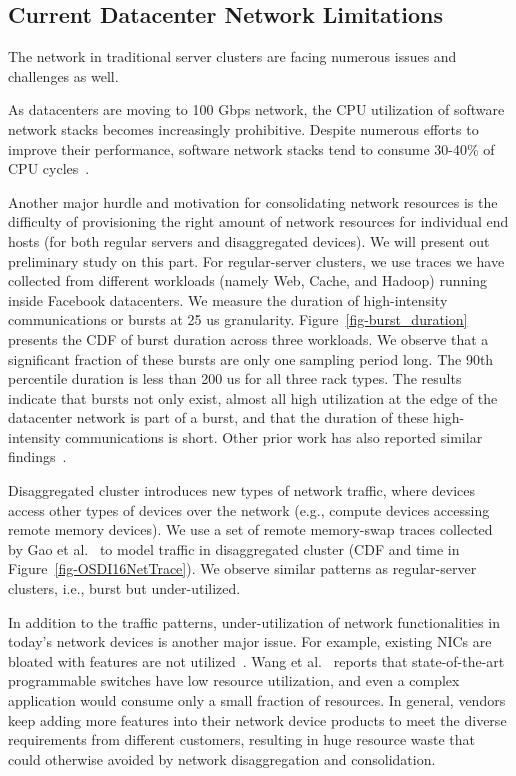 \subsection{Current Datacenter Network Limitations}

The network in traditional server clusters are facing numerous
issues and challenges as well. 

As datacenters are moving to 100 Gbps network,
the CPU utilization of software network stacks becomes increasingly prohibitive.
Despite numerous efforts to improve their performance, software network stacks
tend to consume 30-40\% of CPU cycles~\cite{tonic-nsdi20}.

Another major hurdle and motivation for consolidating network resources
is the difficulty of provisioning the right amount of network resources
for individual end hosts (for both regular servers and disaggregated devices).
We will present out preliminary study on this part.
For regular-server clusters, we use traces we have collected from different
workloads (namely Web, Cache, and Hadoop) running inside Facebook datacenters.
We measure the duration of high-intensity communications or bursts at 25 us granularity.
Figure~\ref{fig-burst_duration} presents the CDF of burst duration across three
workloads. We observe that a significant fraction of these bursts are only one
sampling period long.
The 90th percentile duration is less than 200 us for all three rack types.
The results indicate that bursts not only exist, almost all high utilization
at the edge of the datacenter network is part of a burst, and that the duration
of these high-intensity communications is short.
Other prior work has also reported similar findings~\cite{NetKernel-ATC20}.

Disaggregated cluster introduces new types of network traffic,
where devices access other types of devices over the network
(e.g., compute devices accessing remote memory devices).
We use a set of remote memory-swap traces collected by Gao et al.~\cite{Gao16-OSDI}
to model traffic in disaggregated cluster (CDF and time in Figure~\ref{fig-OSDI16NetTrace}).
We observe similar patterns as regular-server clusters, i.e., burst but under-utilized.

In addition to the traffic patterns, under-utilization of network
functionalities in today's network devices is another major issue.
For example, existing NICs are bloated with features are not utilized~\cite{Caulfield-2018,firestone-nsdi18}.
Wang et al.~\cite{wang-hotcloud20} reports that state-of-the-art programmable switches have
low resource utilization, and even a complex application would consume only a small
fraction of resources. In general, vendors keep adding more features into
their network device products to meet the diverse requirements from different
customers, resulting in huge resource waste that could otherwise avoided
by network disaggregation and consolidation.

